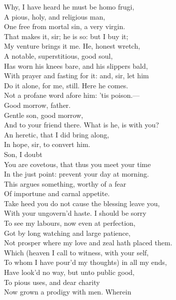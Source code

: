 \documentclass[a4paper,oneside]{memoir}
\begin{document}
\begin{drama*}
\surlyspeaks Why, I have heard he must be homo frugi,\\
A pious, holy, and religious man,\\
One free from mortal sin, a very virgin.\\
\mammonspeaks That makes it, sir; he is so: but I buy it;\\
My venture brings it me. He, honest wretch,\\
A notable, superstitious, good soul,\\
Has worn his knees bare, and his slippers bald,\\
With prayer and fasting for it: and, sir, let him\\
Do it alone, for me, still. Here he comes.\\
Not a profane word afore him: 'tis poison.---\\
Good morrow, father.\\
\subtlespeaks {} Gentle son, good morrow,\\
And to your friend there. What is he, is with you?\\
\mammonspeaks An heretic, that I did bring along,\\
In hope, sir, to convert him.\\
\subtlespeaks {} Son, I doubt\\
You are covetous, that thus you meet your time\\
In the just point: prevent your day at morning.\\
This argues something, worthy of a fear\\
Of importune and carnal appetite.\\
Take heed you do not cause the blessing leave you,\\
With your ungovern'd haste. I should be sorry\\
To see my labours, now even at perfection,\\
Got by long watching and large patience,\\
Not prosper where my love and zeal hath placed them.\\
Which (heaven I call to witness, with your self,\\
To whom I have pour'd my thoughts) in all my ends,\\
Have look'd no way, but unto public good,\\
To pious uses, and dear charity\\
Now grown a prodigy with men. Wherein\\

\end{drama*}
\end{document}
